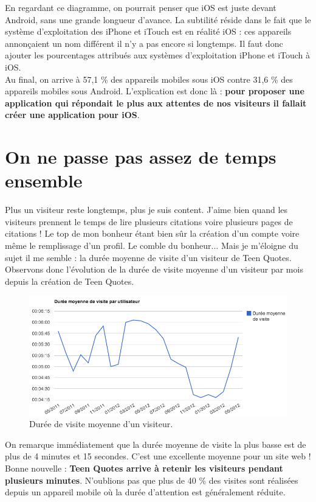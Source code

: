 \documentclass{report}
\begin{document}
	En regardant ce diagramme, on pourrait penser que iOS est juste devant Android, sans une grande longueur d'avance. La subtilité réside dans le fait que le système d'exploitation des iPhone et iTouch est en réalité iOS : ces appareils annonçaient un nom différent il n'y a pas encore si longtemps. Il faut donc ajouter les pourcentages attribués aux systèmes d'exploitation iPhone et iTouch à iOS.\\

	Au final, on arrive à 57,1 \% des appareils mobiles sous iOS contre 31,6 \% des appareils mobiles sous Android. L'explication est donc là : \textbf{pour proposer une application qui répondait le plus aux attentes de nos visiteurs il fallait créer une application pour iOS}.
	\newpage
	\section{On ne passe pas assez de temps ensemble}
	Plus un visiteur reste longtemps, plus je suis content. J'aime bien quand les visiteurs prennent le temps de lire plusieurs citations voire plusieurs pages de citations ! Le top de mon bonheur étant bien sûr la création d'un compte voire même le remplissage d'un profil. Le comble du bonheur... Mais je m'éloigne du sujet il me semble : la durée moyenne de visite d'un visiteur de Teen Quotes.\\

	Observons donc l'évolution de la durée de visite moyenne d'un visiteur par mois depuis la création de Teen Quotes.
	\begin{figure}[H]
		\center
		\includegraphics[width=500px]{images/dureeVisite.png}
		\caption{Durée de visite moyenne d'un visiteur.}
	\end{figure}
	On remarque immédiatement que la durée moyenne de visite la plus basse est de plus de 4 minutes et 15 secondes. C'est une excellente moyenne pour un site web ! Bonne nouvelle : \textbf{Teen Quotes arrive à retenir les visiteurs pendant plusieurs minutes}. N'oublions pas que plus de 40 \% des visites sont réalisées depuis un appareil mobile où la durée d'attention est généralement réduite.\\
\end{document}
